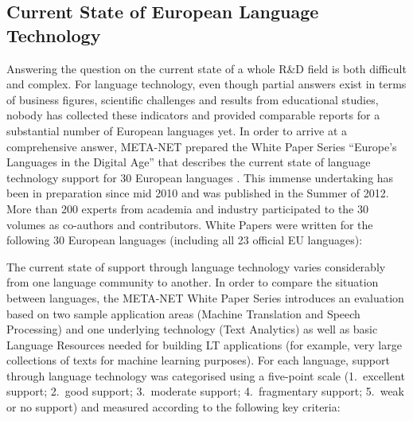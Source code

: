 \documentclass[10pt, plain]{../../metanetpaper}
\begin{document}
\clearpage


\label{sec:lwp}

\begin{multicols}{2}

\subsection{Current State of European Language Technology}
\label{sec:what-current-state}

Answering the question on the current state of a whole R\&D field is both difficult and complex. For language technology, even though partial answers exist in terms of business figures, scientific challenges and results from educational studies, nobody has collected these indicators and provided comparable reports for a substantial number of European languages yet. In order to arrive at a comprehensive answer, META-NET prepared the White Paper Series ``Europe's Languages in the Digital Age'' that describes the current state of language technology support for 30 European languages \cite{LWP2012}. This immense undertaking has been in preparation since mid 2010 and was published in the Summer of 2012. More than 200 experts from academia and industry participated to the 30 volumes as co-authors and contributors. White Papers were written for the following 30 European languages (including all 23 official EU languages):

\medskip
\centerline{}

\medskip 
The current state of support through language technology varies considerably from one language community to another. In order to compare the situation between languages, the META-NET White Paper Series introduces an evaluation based on two sample application areas (Machine Translation and Speech Processing) and one underlying technology (Text Analytics) as well as basic Language Resources needed for building LT applications (for example, very large collections of texts for machine learning purposes). For each language, support through language technology was categorised using a five-point scale (1.~excellent support; 2.~good support; 3.~moderate support; 4.~fragmentary support; 5.~weak or no support) and measured according to the following key criteria:


\end{multicols}
\end{document}
